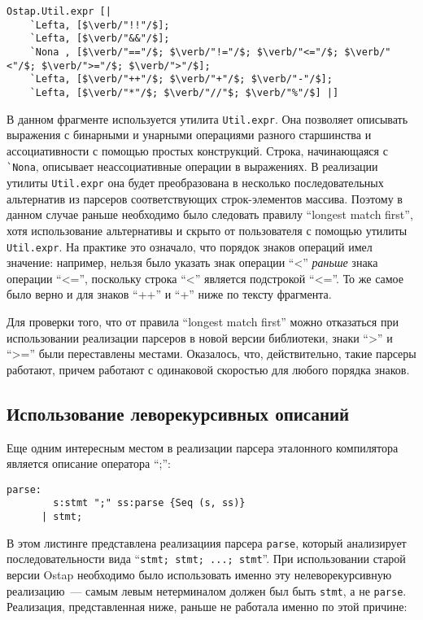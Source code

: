 \documentclass[conference]{IEEEtran}
\begin{document}
\begin{lstlisting}[basicstyle=\small]
  Ostap.Util.expr [|
    `Lefta, [$\verb/"!!"/$];
    `Lefta, [$\verb/"&&"/$];
    `Nona , [$\verb/"=="/$; $\verb/"!="/$; $\verb/"<="/$; $\verb/"<"/$; $\verb/">="/$; $\verb/">"/$];
    `Lefta, [$\verb/"++"/$; $\verb/"+"/$; $\verb/"-"/$];
    `Lefta, [$\verb/"*"/$; $\verb/"//"$; $\verb/"%"/$] |]
\end{lstlisting}

В данном фрагменте используется утилита \lstinline|Util.expr|. Она позволяет описывать выражения
с бинарными и унарными операциями разного старшинства и ассоциативности с помощью простых конструкций. Строка, начинающаяся с \lstinline|`Nona|, описывает неассоциативные
операции в выражениях. В реализации утилиты \lstinline|Util.expr| она будет преобразована в несколько последовательных альтернатив из парсеров соответствующих
строк-элементов массива. Поэтому в данном случае раньше необходимо было следовать правилу ``longest match first'', хотя использование альтернативы и скрыто от пользователя
с помощью утилиты \lstinline|Util.expr|. На практике это означало, что порядок знаков операций имел значение: например, нельзя было указать знак операции ``<'' \emph{раньше}
знака операции ``<='', поскольку строка ``<'' является подстрокой ``<=''. То же самое было верно и для знаков ``++'' и ``+'' ниже по тексту фрагмента.

Для проверки того, что от правила ``longest match first'' можно отказаться при использовании реализации парсеров в новой версии библиотеки, знаки ``>'' и ``>='' были
переставлены местами. Оказалось, что, действительно, такие парсеры работают, причем работают с одинаковой скоростью для любого порядка знаков.

\subsection{Использование леворекурсивных описаний}

Еще одним интересным местом в реализации парсера эталонного компилятора является описание оператора ``;'':

\begin{lstlisting}[basicstyle=\small]
  parse:
        s:stmt ";" ss:parse {Seq (s, ss)}
      | stmt;
\end{lstlisting}

В этом листинге представлена реализациия парсера \lstinline|parse|, который анализирует последовательности вида ``\lstinline|stmt; stmt; ...; stmt|''. При использовании старой
версии Ostap необходимо было использовать именно эту нелеворекурсивную реализацию~--- самым левым нетерминалом должен был быть \lstinline|stmt|, а не \lstinline|parse|. Реализация,
представленная ниже, раньше не работала именно по этой причине:
\end{document}
